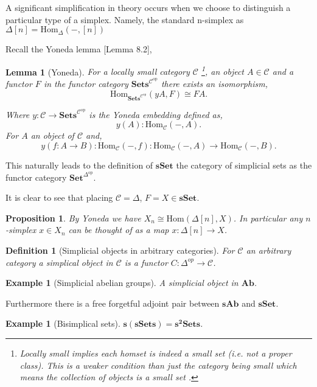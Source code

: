 \documentclass[12pt]{report}
\numberwithin{equation}{section}
\newcommand{\Hom}{{\mathrm{Hom}}}
\newtheorem{definition}[dummy]{Definition}
\newtheorem{lemma}[dummy]{Lemma}
\newtheorem{proposition}[dummy]{Proposition}
\newtheorem{example}[dummy]{Example}
\begin{document}
	A significant simplification in theory occurs when we choose to distinguish a particular type of a simplex. Namely, the standard n-simplex as $\Delta[n]=\Hom_\Delta(-,[n])$
	
	Recall the Yoneda lemma \cite{Awodey}[Lemma 8.2],
	\begin{lemma}[Yoneda]
		For a locally small category $\mathcal{C}$ \footnote{Locally small implies each homset is indeed a small set (i.e. not a proper class). This is a weaker condition than just the category being small which means the collection of objects is a small set .}, an object $A \in \mathcal{C}$ and a functor $F$  in the functor category $\mathbf{Sets}^{\mathcal{C}^\mathrm{op}}$ there exists an isomorphism,\[ \Hom_{\mathbf{Sets}^{\mathcal{C}^\mathrm{op}}}(yA, F) \cong FA.\]
		
		Where $y: \mathcal{C} \to \mathbf{Sets}^{\mathcal{C}^\mathrm{op}}$ is the Yoneda embedding defined as, $$y(A):\Hom_\mathcal{C}(-, A).$$ For $A$ an object of $\mathcal{C}$ and, $$y(f:A \to B):\Hom_\mathcal{C}(-,f): \Hom_\mathcal{C}(-,A) \to \Hom_\mathcal{C}(-,B).$$
	\end{lemma}
	
	This naturally leads to the definition of $\mathbf{sSet}$ the category of simplicial sets as the functor category $\mathbf{Set}^{\Delta^\mathrm{op}}$.
	
	It is clear to see that placing $\mathcal{C}=\Delta$, $F = X \in \mathbf{sSet}$.
	
	\begin{proposition}
		By Yoneda we have $X_n\cong \Hom(\Delta[n],X)$. In particular any $n$-simplex $x \in X_n$ can be thought of as a map $x: \Delta[n] \to X$.
	\end{proposition}
	

	\begin{definition}[Simplicial objects in arbitrary categories]
		For $\mathcal{C}$ an arbitrary category a simplical object in $\mathcal{C}$ is a functor $C: \Delta^{op} \to \mathcal{C}$.
	\end{definition}
	
	\begin{example}[Simplicial abelian groups]
		A simplicial object in $\mathbf{Ab}$.
	\end{example}
	Furthermore there is a free forgetful adjoint pair between $\mathbf{sAb}$ and $\mathbf{sSet}$.
	\begin{example}[Bisimplical sets]
		$\mathbf{s(sSets)=s^2Sets}$.
	\end{example}
	
\end{document}
